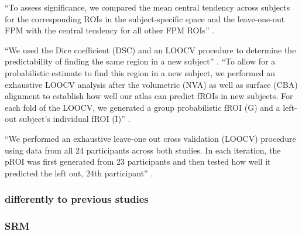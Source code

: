 ``To assess significance, we compared the mean central tendency across subjects
for the corresponding ROIs in the subject-specific space and the leave-one-out
FPM with the central tendency for all other FPM ROIs''
\citep{wang2015probabilistic}.

``We used the Dice coefficient (DSC) and an LOOCV procedure to determine the
predictability of finding the same region in a new subject''
\citet{rosenke2021probabilistic}.
%
``To allow for a probabilistic estimate to find this region in a new subject, we
performed an exhaustive LOOCV analysis after the volumetric (NVA) as well as
surface (CBA) alignment to establish how well our atlas can predict fROIs in new
subjects.
%
For each fold of the LOOCV, we generated a group probabilistic fROI (G) and a
left-out subject's individual fROI (I)'' \citep{rosenke2021probabilistic}.

``We performed an exhaustive leave-one out cross validation (LOOCV) procedure
using data from all 24 participants across both studies.
%
In each iteration, the pROI was first generated from 23 participants and then
tested how well it predicted the left out, 24th participant''
\citep{weiner2018defining}.






\subsubsection{differently to previous studies}






\subsubsection{SRM}




